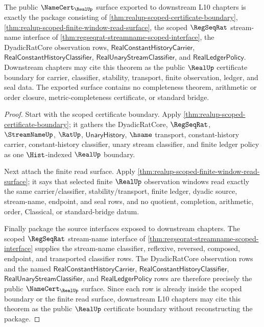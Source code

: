 \begin{theorem}
\label{thm:realup-public-certificate-export}
The public $\NameCert_{\RealUp}$ surface exported to downstream L10 chapters is
exactly the package consisting of
\autoref{thm:realup-scoped-certificate-boundary},
\autoref{thm:realup-scoped-finite-window-read-surface}, the scoped
$\RegSeqRat$ stream-name interface of
\autoref{thm:regseqrat-streamname-scoped-interface}, the DyadicRatCore
observation rows, $\mathsf{RealConstantHistoryCarrier}$,
$\mathsf{RealConstantHistoryClassifier}$,
$\mathsf{RealUnaryStreamClassifier}$, and $\mathsf{RealLedgerPolicy}$.
Downstream chapters may cite this theorem as the public $\RealUp$ certificate
boundary for carrier, classifier, stability, transport, finite observation,
ledger, and seal data. The exported surface contains no completeness theorem,
arithmetic or order closure, metric-completeness certificate, or standard
bridge.
\end{theorem}
\begin{proof}
Start with the scoped certificate boundary. Apply
\autoref{thm:realup-scoped-certificate-boundary}; it gathers the
DyadicRatCore, $\RegSeqRat$, $\StreamNameUp$, $\RatUp$,
$\mathsf{UnaryHistory}$, $\hsame$ transport, constant-history carrier,
constant-history classifier, unary stream classifier, and finite ledger policy
as one $\Hist$-indexed $\RealUp$ boundary.

Next attach the finite read surface. Apply
\autoref{thm:realup-scoped-finite-window-read-surface}; it says that selected
finite $\RealUp$ observation windows read exactly the same carrier/classifier,
stability/transport, finite ledger, dyadic source, stream-name, endpoint, and
seal rows, and no quotient, completion, arithmetic, order, Classical, or
standard-bridge datum.

Finally package the source interfaces exposed to downstream chapters. The
scoped $\RegSeqRat$ stream-name interface of
\autoref{thm:regseqrat-streamname-scoped-interface} supplies the stream-name
classifier, reflexive, reversed, composed, endpoint, and transported
classifier rows. The DyadicRatCore observation rows and the named
$\mathsf{RealConstantHistoryCarrier}$,
$\mathsf{RealConstantHistoryClassifier}$,
$\mathsf{RealUnaryStreamClassifier}$, and $\mathsf{RealLedgerPolicy}$ rows are
therefore precisely the public $\NameCert_{\RealUp}$ surface. Since each row is
already inside the scoped boundary or the finite read surface, downstream L10
chapters may cite this theorem as the public $\RealUp$ certificate boundary
without reconstructing the package.
\end{proof}

